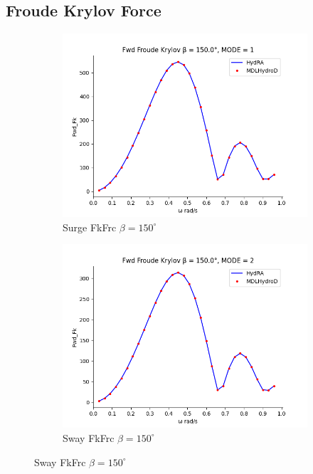 \subsection{Froude Krylov Force}
\begin{figure}[H]
    \centering
    \begin{subfigure}[b]{0.45\textwidth}
        \includegraphics[width=\textwidth]{plots/kcs/fk/fk1.png}
        \caption{Surge FkFrc $\beta = 150^{\circ}$}
    \end{subfigure}
    \begin{subfigure}[b]{0.45\textwidth}
        \includegraphics[width=\textwidth]{plots/kcs/fk/fk2.png}
        \caption{Sway FkFrc $\beta = 150^{\circ}$}
    \end{subfigure}

\end{figure}
